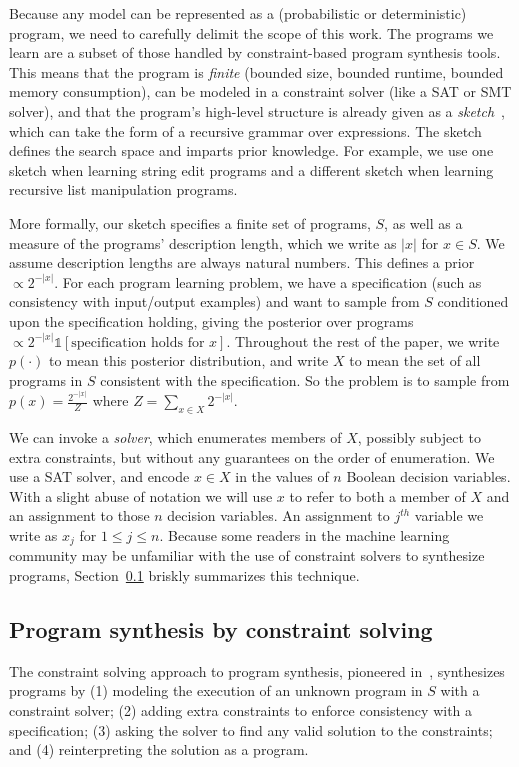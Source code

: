 \documentclass{article}
\begin{document}
Because any model can be represented as a (probabilistic or deterministic) program,
we need to carefully delimit
the scope of this work.
The programs we learn are a subset of those handled by constraint-based program synthesis tools.
This means that the program is \emph{finite} (bounded size, bounded runtime, bounded memory consumption),
can be modeled in a constraint solver (like a SAT or SMT solver),
and that the program's high-level structure is already given as a \emph{sketch}~\cite{solar2008program},
which can take the form of a recursive grammar over expressions.
The sketch defines the search space and imparts prior knowledge.
For example,
we use one sketch when learning string edit programs and a different sketch when learning recursive list manipulation programs.

More formally, our sketch specifies a finite set of programs, $S$,
as well as a measure of the programs' description length,
which we write as $\lvert x \rvert$ for $x\in S$.
We assume description lengths are always natural numbers.
This defines a prior $\propto 2^{- \lvert x \rvert }$.
For each program learning problem,
we have a specification (such as consistency with input/output examples)
and want to sample from $S$ conditioned upon the specification holding,
giving the posterior over programs $\propto 2^{- \lvert x \rvert } \mathds{1}[\text{specification holds for }x]$.
Throughout the rest of the paper, we write $p(\cdot )$ to mean this posterior distribution, and write $X$ to mean the set of all  programs in $S$  consistent with the specification.
So the problem is to sample from  $p(x) = \frac{2^{-|x|}}{Z}$  where $Z = \sum_{x\in X} 2^{-|x|}$.

We can invoke a \emph{solver}, which enumerates members of $X$,
possibly subject to extra constraints, but without any guarantees on
the order of enumeration.  We use a SAT solver, and encode $x\in X$ in
the values of $n$ Boolean decision variables.  With a slight abuse of
notation we will use $x$ to refer to both a member of $X$ and an
assignment to those $n$ decision variables.  An assignment to $j^{th}$
variable we write as $x_j$ for $1\leq j\leq n$.  Because some readers
in the machine learning community may be unfamiliar with the use of
constraint solvers to synthesize programs, Section~\ref{brisk} briskly
summarizes this technique.

\subsection{Program synthesis by constraint solving}\label{brisk}
The constraint solving approach to program synthesis, pioneered
in~\cite{solar2008program,srivastava2010program,jha2010oracle},
synthesizes programs by (1) modeling the execution of an unknown
program in $S$ with a constraint solver; (2) adding extra constraints to
enforce consistency with a specification; (3) asking the solver to
find any valid solution to the constraints; and (4) reinterpreting the
solution as a program.
\end{document}

